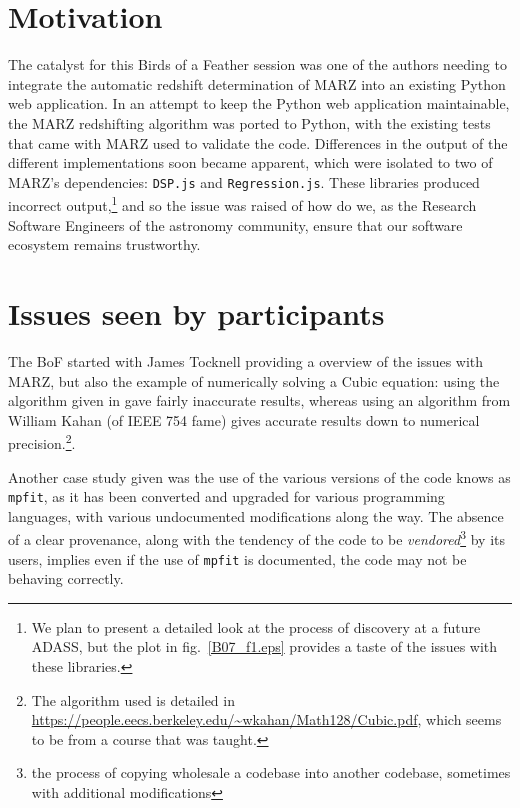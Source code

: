 \documentclass[11pt,twoside]{article}
\begin{document}
\section{Motivation}
The catalyst for this Birds of a Feather session was one of the authors needing
to integrate the automatic redshift determination of MARZ
\citep{2016ascl.soft05001H} into an existing Python web application. In an
attempt to keep the Python web application maintainable, the MARZ redshifting
algorithm was ported to Python, with the existing tests that came with MARZ used
to validate the code. Differences in the output of the different implementations
soon became apparent, which were isolated to two of MARZ's dependencies:
\texttt{DSP.js} and \texttt{Regression.js}. These libraries produced incorrect
output,\footnote{We plan to present a detailed look at the process of discovery
at a future ADASS, but the plot in fig.~\ref{B07_f1.eps} provides a taste of the
issues with these libraries.} and so the issue was raised of how do we, as the
Research Software Engineers of the astronomy community, ensure that our software
ecosystem remains trustworthy.


\section{Issues seen by participants}
The BoF started with James Tocknell providing a overview of the issues with
MARZ, but also the example of numerically solving a Cubic equation: using the
algorithm given in \citet{1992nrfa.book.....P} gave fairly inaccurate results,
whereas using an algorithm from William Kahan (of IEEE 754 fame) gives accurate
results down to numerical precision.\footnote{The algorithm used is detailed in
  \url{https://people.eecs.berkeley.edu/~wkahan/Math128/Cubic.pdf}, which seems
  to be from a course that was taught.}.

Another case study given was the use of the various versions of the code knows
as \texttt{mpfit}, as it has been converted and upgraded for various programming
languages, with various undocumented modifications along the way. The absence of
a clear provenance, along with the tendency of the code to be
\emph{vendored}\footnote{the process of copying wholesale a codebase into
  another codebase, sometimes with additional modifications} by its users,
implies even if the use of \texttt{mpfit} is documented, the code may not be
behaving correctly.
\end{document}
